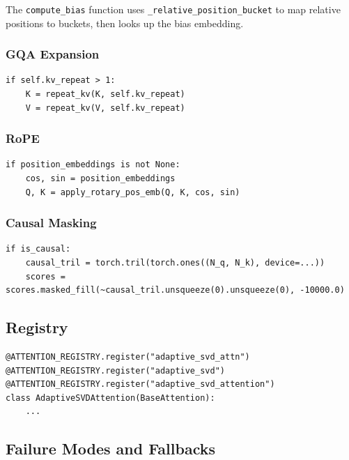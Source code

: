 The \texttt{compute\_bias} function uses \texttt{\_relative\_position\_bucket} to map relative 
positions to buckets, then looks up the bias embedding.

\subsubsection{GQA Expansion}

\begin{lstlisting}
if self.kv_repeat > 1:
    K = repeat_kv(K, self.kv_repeat)
    V = repeat_kv(V, self.kv_repeat)
\end{lstlisting}

\subsubsection{RoPE}

\begin{lstlisting}
if position_embeddings is not None:
    cos, sin = position_embeddings
    Q, K = apply_rotary_pos_emb(Q, K, cos, sin)
\end{lstlisting}

\subsubsection{Causal Masking}

\begin{lstlisting}
if is_causal:
    causal_tril = torch.tril(torch.ones((N_q, N_k), device=...))
    scores = scores.masked_fill(~causal_tril.unsqueeze(0).unsqueeze(0), -10000.0)
\end{lstlisting}

\subsection{Registry}

\begin{lstlisting}
@ATTENTION_REGISTRY.register("adaptive_svd_attn")
@ATTENTION_REGISTRY.register("adaptive_svd")
@ATTENTION_REGISTRY.register("adaptive_svd_attention")
class AdaptiveSVDAttention(BaseAttention):
    ...
\end{lstlisting}

\subsection{Failure Modes and Fallbacks}


